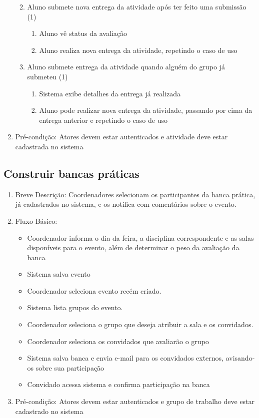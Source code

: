 \begin{enumerate}
\begin{enumerate}
\begin{enumerate}
        \end{enumerate}
        \item Aluno submete nova entrega da atividade após ter feito uma submissão (1)
        \begin{enumerate}
            \item Aluno vê status da avaliação
            \item Aluno realiza nova entrega da atividade, repetindo o caso de uso
        \end{enumerate}
        \item Aluno submete entrega da atividade quando alguém do grupo já submeteu (1)
        \begin{enumerate}
            \item Sistema exibe detalhes da entrega já realizada
            \item Aluno pode realizar nova entrega da atividade, passando por cima da entrega anterior e repetindo o caso de uso
        \end{enumerate}
    \end{enumerate}
    \item Pré-condição: Atores devem estar autenticados e atividade deve estar cadastrada no sistema
\end{enumerate}


\subsection{Construir bancas práticas}
\begin{enumerate}
    \item Breve Descrição: Coordenadores selecionam os participantes da banca prática, já cadastrados no sistema, e os notifica com comentários sobre o evento.
    \item Fluxo Básico:
    \begin{itemize}
        \item Coordenador informa o dia da feira, a disciplina correspondente e as salas disponíveis para o evento, além de determinar o peso da avaliação da banca
        \item Sistema salva evento
        \item Coordenador seleciona evento recém criado.
        \item Sistema lista grupos do evento.
        \item Coordenador seleciona o grupo que deseja atribuir a sala e os convidados.
        \item Coordenador seleciona os convidados que avaliarão o grupo
        \item Sistema salva banca e envia e-mail para os convidados externos, avisando-os sobre sua participação
        \item Convidado acessa sistema e confirma participação na banca
    \end{itemize}
    \item Pré-condição: Atores devem estar autenticados e grupo de trabalho deve estar cadastrado no sistema
\end{enumerate}

